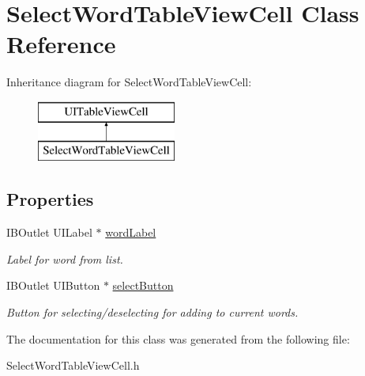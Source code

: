 \hypertarget{interface_select_word_table_view_cell}{\section{Select\+Word\+Table\+View\+Cell Class Reference}
\label{interface_select_word_table_view_cell}
}
Inheritance diagram for Select\+Word\+Table\+View\+Cell\+:\begin{figure}[H]
\begin{center}
\leavevmode
\includegraphics[height=2.000000cm]{interface_select_word_table_view_cell}
\end{center}
\end{figure}
\subsection*{Properties}
\begin{DoxyCompactItemize}
\item 
\hypertarget{interface_select_word_table_view_cell_ae779b55a4f98bc59ed59bcd7443c6298}{I\+B\+Outlet U\+I\+Label $\ast$ \hyperlink{interface_select_word_table_view_cell_ae779b55a4f98bc59ed59bcd7443c6298}{word\+Label}}\label{interface_select_word_table_view_cell_ae779b55a4f98bc59ed59bcd7443c6298}

\begin{DoxyCompactList}\small\item\em Label for word from list. \end{DoxyCompactList}\item 
\hypertarget{interface_select_word_table_view_cell_a74a05dda4ca36d1499b52df54c5a2210}{I\+B\+Outlet U\+I\+Button $\ast$ \hyperlink{interface_select_word_table_view_cell_a74a05dda4ca36d1499b52df54c5a2210}{select\+Button}}\label{interface_select_word_table_view_cell_a74a05dda4ca36d1499b52df54c5a2210}

\begin{DoxyCompactList}\small\item\em Button for selecting/deselecting for adding to current words. \end{DoxyCompactList}\end{DoxyCompactItemize}


The documentation for this class was generated from the following file\+:\begin{DoxyCompactItemize}
\item 
Select\+Word\+Table\+View\+Cell.\+h\end{DoxyCompactItemize}
